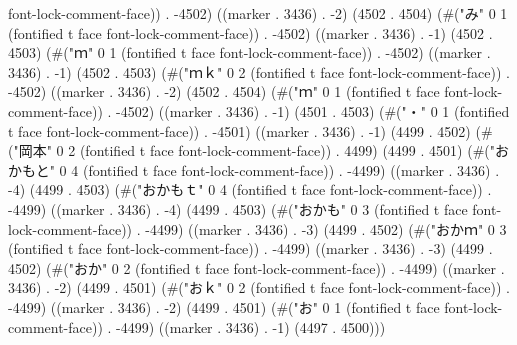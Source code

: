 font-lock-comment-face)) . -4502) ((marker . 3436) . -2) (4502 . 4504) (#("み" 0 1 (fontified t face font-lock-comment-face)) . -4502) ((marker . 3436) . -1) (4502 . 4503) (#("ｍ" 0 1 (fontified t face font-lock-comment-face)) . -4502) ((marker . 3436) . -1) (4502 . 4503) (#("ｍｋ" 0 2 (fontified t face font-lock-comment-face)) . -4502) ((marker . 3436) . -2) (4502 . 4504) (#("ｍ" 0 1 (fontified t face font-lock-comment-face)) . -4502) ((marker . 3436) . -1) (4501 . 4503) (#("・" 0 1 (fontified t face font-lock-comment-face)) . -4501) ((marker . 3436) . -1) (4499 . 4502) (#("岡本" 0 2 (fontified t face font-lock-comment-face)) . 4499) (4499 . 4501) (#("おかもと" 0 4 (fontified t face font-lock-comment-face)) . -4499) ((marker . 3436) . -4) (4499 . 4503) (#("おかもｔ" 0 4 (fontified t face font-lock-comment-face)) . -4499) ((marker . 3436) . -4) (4499 . 4503) (#("おかも" 0 3 (fontified t face font-lock-comment-face)) . -4499) ((marker . 3436) . -3) (4499 . 4502) (#("おかｍ" 0 3 (fontified t face font-lock-comment-face)) . -4499) ((marker . 3436) . -3) (4499 . 4502) (#("おか" 0 2 (fontified t face font-lock-comment-face)) . -4499) ((marker . 3436) . -2) (4499 . 4501) (#("おｋ" 0 2 (fontified t face font-lock-comment-face)) . -4499) ((marker . 3436) . -2) (4499 . 4501) (#("お" 0 1 (fontified t face font-lock-comment-face)) . -4499) ((marker . 3436) . -1) (4497 . 4500)))
